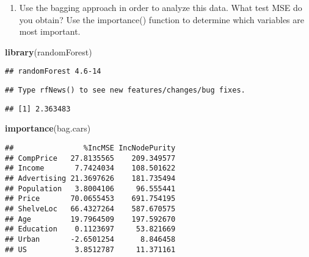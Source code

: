 \documentclass[]{article}
\newenvironment{Shaded}{\begin{snugshade}}{\end{snugshade}}
\newcommand{\KeywordTok}[1]{\textcolor[rgb]{0.13,0.29,0.53}{\textbf{#1}}}
\newcommand{\DataTypeTok}[1]{\textcolor[rgb]{0.13,0.29,0.53}{#1}}
\newcommand{\DecValTok}[1]{\textcolor[rgb]{0.00,0.00,0.81}{#1}}
\newcommand{\OtherTok}[1]{\textcolor[rgb]{0.56,0.35,0.01}{#1}}
\newcommand{\OperatorTok}[1]{\textcolor[rgb]{0.81,0.36,0.00}{\textbf{#1}}}
\newcommand{\NormalTok}[1]{#1}
\providecommand{\tightlist}{%
  \setlength{\itemsep}{0pt}\setlength{\parskip}{0pt}}
\begin{document}
\begin{enumerate}
\def\labelenumi{(\alph{enumi})}
\setcounter{enumi}{3}
\tightlist
\item
  Use the bagging approach in order to analyze this data. What test MSE
  do you obtain? Use the importance() function to determine which
  variables are most important.
\end{enumerate}

\begin{Shaded}
\begin{Highlighting}[]
\KeywordTok{library}\NormalTok{(randomForest)}
\end{Highlighting}
\end{Shaded}

\begin{verbatim}
## randomForest 4.6-14
\end{verbatim}

\begin{verbatim}
## Type rfNews() to see new features/changes/bug fixes.
\end{verbatim}

\begin{Shaded}
\end{Shaded}

\begin{verbatim}
## [1] 2.363483
\end{verbatim}

\begin{Shaded}
\begin{Highlighting}[]
\KeywordTok{importance}\NormalTok{(bag.cars)}
\end{Highlighting}
\end{Shaded}

\begin{verbatim}
##                %IncMSE IncNodePurity
## CompPrice   27.8135565    209.349577
## Income       7.7424034    108.501622
## Advertising 21.3697626    181.735494
## Population   3.8004106     96.555441
## Price       70.0655453    691.754195
## ShelveLoc   66.4327264    587.670575
## Age         19.7964509    197.592670
## Education    0.1123697     53.821669
## Urban       -2.6501254      8.846458
## US           3.8512787     11.371161
\end{verbatim}
\end{document}
